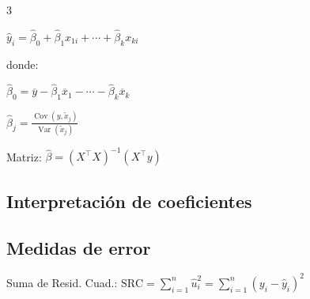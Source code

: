 \documentclass[10pt, a4paper, landscape]{article}
\DeclareMathOperator{\Var}{Var}
\DeclareMathOperator{\Cov}{Cov}
\newcommand{\SSR}{\text{SRC}}
\begin{document}
\begin{multicols}{3}
\begin{minipage}{0.58\columnwidth}
	\begin{center}
		\( \hat{y}_{i} = \hat{\beta}_{0} + \hat{\beta}_{1} x_{1i} + \cdots + \hat{\beta}_{k} x_{ki} \)
	\end{center}
	
	donde:
	
	\begin{center}
		\( \hat{\beta}_{0} = \overline{y} - \hat{\beta}_{1} \overline{x}_{1} - \cdots - \hat{\beta}_{k} \overline{x}_{k} \)
	
		\( \hat{\beta}_{j} = \frac{\Cov(y, \tilde{x}_{j})}{\Var(\tilde{x}_{j})} \)
	\end{center}
	
	Matriz: \( \hat{\beta} = (X^{\top} X)^{-1}(X^{\top} y) \)
\end{minipage}

\subsection*{Interpretación de coeficientes}

\begin{center}
\end{center}

\subsection*{Medidas de error}

Suma de Resid. Cuad.: \hfill \( \SSR = \sum_{i = 1}^{n} \hat{u}_{i}^{2} = \sum_{i = 1}^{n} (y_{i} - \hat{y}_{i})^{2} \)


\end{multicols}
\end{document}
